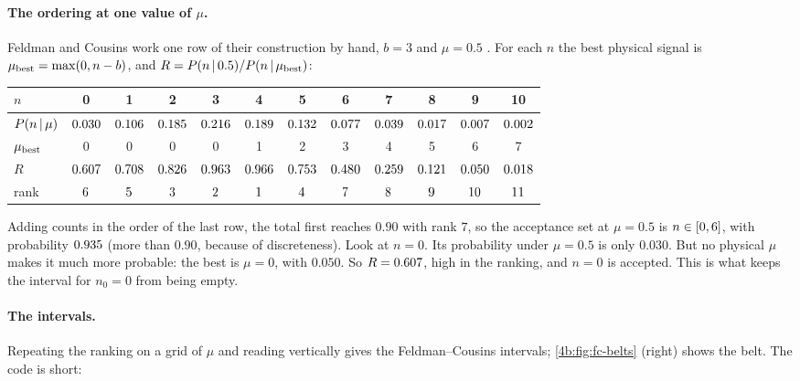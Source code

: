 \paragraph{The ordering at one value of $\mu$.}
Feldman and Cousins work one row of their construction by hand, $b=3$ and
$\mu=0.5$ \cite[Table~I]{FeldmanCousins1998}. For each $n$ the best physical
signal is $\mu_{\rm best}=\max(0,n-b)$, and $R=P(n\,\vert\,0.5)/P(n\,\vert\,\mu_{\rm best})$:
\begin{center}
\small
\begin{tabular}{l*{11}{c}}
\toprule
$n$ & 0 & 1 & 2 & 3 & 4 & 5 & 6 & 7 & 8 & 9 & 10\\
\midrule
$P(n\,\vert\,\mu)$ & $0.030$ & $0.106$ & $0.185$ & $0.216$ & $0.189$ & $0.132$ & $0.077$ & $0.039$ & $0.017$ & $0.007$ & $0.002$\\
$\mu_{\rm best}$ & 0 & 0 & 0 & 0 & 1 & 2 & 3 & 4 & 5 & 6 & 7\\
$R$ & $0.607$ & $0.708$ & $0.826$ & $0.963$ & $0.966$ & $0.753$ & $0.480$ & $0.259$ & $0.121$ & $0.050$ & $0.018$\\
rank & $6$ & $5$ & $3$ & $2$ & $1$ & $4$ & $7$ & $8$ & $9$ & $10$ & $11$\\
\bottomrule
\end{tabular}
\end{center}
Adding counts in the order of the last row, the total first reaches $0.90$ with
rank $7$, so the acceptance set at $\mu=0.5$ is $n\in[0,6]$,
with probability $0.935$ (more than $0.90$, because of discreteness).
Look at $n=0$. Its probability under $\mu=0.5$ is only $0.030$. But no physical
$\mu$ makes it much more probable: the best is $\mu=0$, with $0.050$. So
$R=0.607$, high in the ranking, and $n=0$ is accepted. This is what
keeps the interval for $n_0=0$ from being empty.

\paragraph{The intervals.}
Repeating the ranking on a grid of $\mu$ and reading vertically gives the
Feldman--Cousins intervals; \cref{4b:fig:fc-belts} (right) shows the belt. The
code is short:

